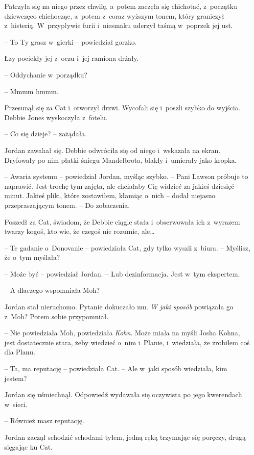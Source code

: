\documentclass[oneside,polish,11pt,sfheadings]{mwbk}
\begin{document}
Patrzyła się na niego przez chwilę, a~potem zaczęła się chichotać, z~początku dziewczęco chichocząc, a~potem z~coraz wyższym tonem, który
graniczył z~histerią. W~przypływie furii i~niesmaku uderzył taśmą w~poprzek jej ust.

-- To Ty grasz w~gierki -- powiedział gorzko.

Łzy pociekły jej z~oczu i~jej ramiona drżały.

-- Oddychanie w~porządku?

-- Mmmm hmmm.

Przesunął się za Cat i~otworzył drzwi. Wycofali się i~poszli szybko do
wyjścia. Debbie Jones wyskoczyła z~fotelu.

-- Co się dzieje? -- zażądała.

Jordan zawahał się. Debbie odwróciła się od niego i~wskazała na ekran.
Dryfowały po nim płatki śniegu Mandelbrota, blakły i~umierały jako
kropka.

-- Awaria systemu -- powiedział Jordan, myśląc szybko. -- Pani Lawson
próbuje to naprawić. Jest trochę tym zajęta, ale chciałaby Cię widzieć
za jakieś dziesięć minut. Jakieś pliki, które zostawiłem, kłamiąc o~nich
-- dodał niejasno przepraszającym tonem. -- Do zobaczenia.

Poszedł za Cat, świadom, że Debbie ciągle stała i~obserwowała ich z~wyrazem twarzy kogoś, kto wie, że czegoś nie rozumie, ale\ldots

-- Te gadanie o~Donovanie -- powiedziała Cat, gdy tylko wyszli z~biura. -- Myślisz, że o~tym myślała?

-- Może być -- powiedział Jordan. -- Lub dezinformacja. Jest w~tym
ekspertem.

-- A dlaczego wspomniała Moh?

Jordan stał nieruchomo. Pytanie dokuczało mu. \emph{W jaki sposób}
powiązała go z~Moh? Potem sobie przypomniał.

-- Nie powiedziała Moh, powiedziała \emph{Kohn}. Może miała na myśli
Josha Kohna, jest dostatecznie stara, żeby wiedzieć o~nim i~Planie, i~wiedziała, że zrobiłem coś dla Planu.

-- Ta, ma reputację -- powiedziała Cat. -- Ale w~jaki sposób wiedziała, kim
jestem?

Jordan się uśmiechnął. Odpowiedź wydawała się oczywista po jego
kwerendach w~sieci. 

-- Również masz reputację.

Jordan zaczął schodzić schodami tyłem, jedną ręką trzymając się poręczy,
drugą sięgając ku Cat.
\end{document}
